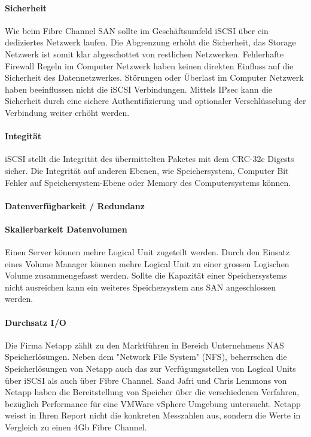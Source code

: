 \paragraph*{Sicherheit}
Wie beim Fibre Channel SAN sollte im Geschäftsumfeld iSCSI über ein dediziertes Netzwerk laufen. Die Abgrenzung erhöht die Sicherheit, das Storage Netzwerk ist somit klar abgeschottet von restlichen Netzwerken. Fehlerhafte Firewall Regeln im Computer Netzwerk haben keinen direkten Einfluss auf die Sicherheit des Datennetzwerkes. Störungen oder Überlast im Computer Netzwerk haben beeinflussen nicht die iSCSI Verbindungen. Mittels IPsec kann die Sicherheit durch eine sichere Authentifizierung und optionaler Verschlüsselung der Verbindung weiter erhöht werden. 

\paragraph*{Integität}
iSCSI stellt die Integrität des übermittelten Paketes mit dem CRC-32c Digests sicher. Die Integrität auf anderen Ebenen, wie Speichersystem, Computer Bit Fehler auf Speichersystem-Ebene oder Memory des Computersystems können. 

\paragraph*{Datenverfügbarkeit / Redundanz}


\paragraph*{Skalierbarkeit Datenvolumen}
Einen Server können mehre Logical Unit zugeteilt werden. Durch den Einsatz eines Volume Manager können mehre Logical Unit zu einer grossen Logischen Volume zusammengefasst werden. Sollte die Kapazität einer Speichersystems nicht ausreichen kann ein weiteres Speichersystem ans SAN angeschlossen werden.

\paragraph*{Durchsatz I/O}
Die Firma Netapp zählt zu den Marktführen in Bereich Unternehmens NAS Speicherlösungen. Neben dem "Network File System" (NFS), beherrschen die Speicherlösungen von Netapp auch das zur Verfügungsstellen von Logical Units über iSCSI als auch über Fibre Channel. Saad Jafri und Chris Lemmons von Netapp haben die Bereitstellung von Speicher über die verschiedenen Verfahren, bezüglich Performance für eine VMWare vSphere Umgebung untersucht. Netapp weisst in Ihren Report nicht die konkreten Messzahlen aus, sondern die Werte in Vergleich zu einen 4Gb Fibre Channel.

